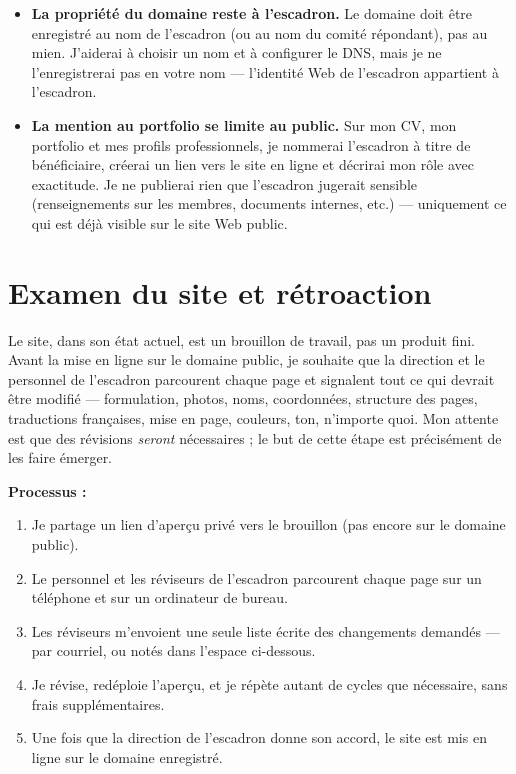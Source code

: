 \documentclass[11pt,letterpaper]{article}
\begin{document}
\begin{itemize}[leftmargin=1.4em,itemsep=0.4em]
  \item \textbf{La propriété du domaine reste à l'escadron.} Le domaine doit être enregistré au nom de l'escadron (ou au nom du comité répondant), pas au mien. J'aiderai à choisir un nom et à configurer le DNS, mais je ne l'enregistrerai pas en votre nom --- l'identité Web de l'escadron appartient à l'escadron.
  \item \textbf{La mention au portfolio se limite au public.} Sur mon CV, mon portfolio et mes profils professionnels, je nommerai l'escadron à titre de bénéficiaire, créerai un lien vers le site en ligne et décrirai mon rôle avec exactitude. Je ne publierai rien que l'escadron jugerait sensible (renseignements sur les membres, documents internes, etc.) --- uniquement ce qui est déjà visible sur le site Web public.
\end{itemize}

\section{Examen du site et rétroaction}\label{sec:revision}

Le site, dans son état actuel, est un brouillon de travail, pas un produit fini. Avant la mise en ligne sur le domaine public, je souhaite que la direction et le personnel de l'escadron parcourent chaque page et signalent tout ce qui devrait être modifié --- formulation, photos, noms, coordonnées, structure des pages, traductions françaises, mise en page, couleurs, ton, n'importe quoi. Mon attente est que des révisions \emph{seront} nécessaires ; le but de cette étape est précisément de les faire émerger.

\textbf{Processus :}
\begin{enumerate}[leftmargin=1.6em,itemsep=0.25em]
  \item Je partage un lien d'aperçu privé vers le brouillon (pas encore sur le domaine public).
  \item Le personnel et les réviseurs de l'escadron parcourent chaque page sur un téléphone et sur un ordinateur de bureau.
  \item Les réviseurs m'envoient une seule liste écrite des changements demandés --- par courriel, ou notés dans l'espace ci-dessous.
  \item Je révise, redéploie l'aperçu, et je répète autant de cycles que nécessaire, sans frais supplémentaires.
  \item Une fois que la direction de l'escadron donne son accord, le site est mis en ligne sur le domaine enregistré.
\end{enumerate}
\end{document}
